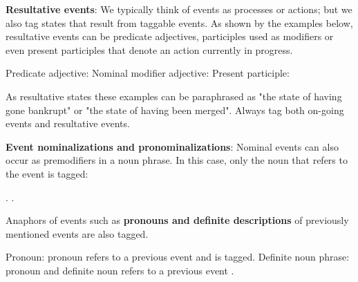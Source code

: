 \textbf{Resultative events}:
We typically think of events as processes or actions; but we also tag states that result from taggable events.
As shown by the examples below, resultative events can be predicate adjectives, participles used as modifiers or even present participles that denote an action currently in progress.

\begin{exe}
    \ex\label{ex/predicateadjective} Predicate adjective: 
    \ex\label{ex/npadjective} Nominal modifier adjective: 
    \ex\label{ex/presentparticiple} Present participle: 
\end{exe}

As resultative states these examples can be paraphrased as "the state of having gone bankrupt" or "the state of having been merged".
Always tag both on-going events and resultative events.

\textbf{Event nominalizations and pronominalizations}:
Nominal events can also occur as premodifiers in a noun phrase.
In this case, only the noun that refers to the event is tagged:

\begin{exe}
    \ex {}
        \expl {}
    \ex {}.
        \expl {}
    \ex {}.
        \expl {}
\end{exe}

Anaphors of events such as \textbf{pronouns and definite descriptions} of previously mentioned events are also tagged.

\begin{exe}
    \ex\label{ex/pronoun1} Pronoun: 
        \expl pronoun  refers to a previous  event and is tagged.
    \ex\label{ex/pronoun2} Definite noun phrase: 
        \expl pronoun  and definite noun  refers to a previous event .
\end{exe}

